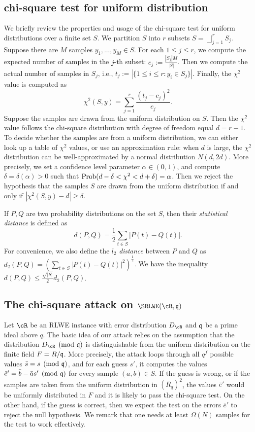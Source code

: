 \documentclass{amsart}
\newcommand{\tinytodo}[2][]
{\todo[caption={#2}, #1]{\renewcommand{\baselinestretch}{0.5}\selectfont#2\par}}
\newcommand{\Katetodo}[1]{\tinytodo[color=green!20]{#1}}
\begin{document}
\subsection{chi-square test for uniform distribution}
We briefly review the properties and usage of the chi-square test for uniform distributions over a finite set $S$. We partition $S$ into $r$ subsets $S = \bigsqcup_{j=1}^r S_j$.
Suppose there are $M$ samples $y_1, \ldots, y_M \in S$.
For each $1 \leq j \leq r$, we compute the expected number of samples in the $j$-th subset: $c_j := \frac{|S_j|M}{|S|}$. Then we compute the actual number of samples in $S_j$, i.e., $t_j := |\{1 \leq i \leq r: y_i \in S_j\}|$. Finally, the $\chi^2$ value is computed as
\[
    \chi^2(S,y) = \sum_{j = 1}^r \frac{(t_j -c_j)^2}{c_j}.
\]
Suppose the samples are drawn from the uniform distribution on $S$. Then the $\chi^2$ value follows the chi-square distribution with degree of freedom equal $d = r-1$. 
To decide whether the samples are from a uniform distribution, we can either look up a table of $\chi^2$ values, or use an approximation rule:  when $d$ is large, the $\chi^2$ distribution can be well-approximated by a normal distribution $N(d, 2d)$. More precisely, we set a confidence level parameter $\alpha \in (0,1)$, and compute $\delta = \delta(\alpha) > 0$ such that $\operatorname{Prob}( d-\delta < \chi^2 < d+\delta) = \alpha$. Then we reject the hypothesis that the samples $S$ are drawn from the uniform distribution if and only if  $|\chi^2(S,y) -d | \geq \delta$.\Katetodo{I took out subscript $r-1$ on chi in prob}

If $P,Q$ are two probability distributions on the set $S$, then their {\it statistical distance} is defined as
\[
    d(P,Q) = \frac{1}{2} \sum_{t \in S} |P(t) - Q(t)|.
\]
For convenience, we also define the {\it $l_2$ distance} between $P$ and $Q$ as $d_2(P,Q) = (\sum_{t \in S} |P(t) - Q(t)|^2)^{\frac{1}{2}}$. We have the inequality $d(P,Q) \leq \frac{\sqrt{|S|}}{2}d_2(P,Q)$.


\subsection{The chi-square attack on $\SRLWE(\cR,\fq)$}

Let $\cR$ be an RLWE instance with error distribution $D_{\cR}$ and $\mathfrak{q}$ be a prime ideal above $q$.  The basic idea of our attack relies on the assumption that the distribution $D_\cR \pmod {\fq}$ is distinguishable from the uniform distribution on the finite field $F = R/\mathfrak{q}$. More precisely, the attack loops through all $q^f$ possible values $\bar{s} = s \pmod{\mathfrak{q}}$, and for each guess $s'$, it computes the values $\bar{e}' = \bar{b} - \bar{a} s' \pmod {\mathfrak{q}}$ for every sample $(a,b) \in S$. If the guess is wrong, or if the samples are taken from the uniform distribution in $(R_q)^2$, the values $\bar{e}'$ would be uniformly distributed in $F$ and it is likely to pass the chi-square test. On the other hand, if the guess is correct, then we expect the test on the errors $\bar{e}'$ to reject the null hypothesis. We remark that one needs at least $\Omega(N)$ samples for the test to work effectively. 
\end{document}
